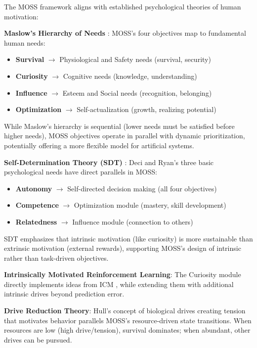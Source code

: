 \documentclass[10pt,a4paper]{article}
\begin{document}
The MOSS framework aligns with established psychological theories of human motivation:

\textbf{Maslow's Hierarchy of Needs} \cite{maslow1943}: MOSS's four objectives map to fundamental human needs:
\begin{itemize}
    \item \textbf{Survival} $\rightarrow$ Physiological and Safety needs (survival, security)
    \item \textbf{Curiosity} $\rightarrow$ Cognitive needs (knowledge, understanding)
    \item \textbf{Influence} $\rightarrow$ Esteem and Social needs (recognition, belonging)
    \item \textbf{Optimization} $\rightarrow$ Self-actualization (growth, realizing potential)
\end{itemize}

While Maslow's hierarchy is sequential (lower needs must be satisfied before higher needs), MOSS objectives operate in parallel with dynamic prioritization, potentially offering a more flexible model for artificial systems.

\textbf{Self-Determination Theory (SDT)} \cite{ryan2000}: Deci and Ryan's three basic psychological needs have direct parallels in MOSS:
\begin{itemize}
    \item \textbf{Autonomy} $\rightarrow$ Self-directed decision making (all four objectives)
    \item \textbf{Competence} $\rightarrow$ Optimization module (mastery, skill development)
    \item \textbf{Relatedness} $\rightarrow$ Influence module (connection to others)
\end{itemize}

SDT emphasizes that intrinsic motivation (like curiosity) is more sustainable than extrinsic motivation (external rewards), supporting MOSS's design of intrinsic rather than task-driven objectives.

\textbf{Intrinsically Motivated Reinforcement Learning}: The Curiosity module directly implements ideas from ICM \cite{pathak2017}, while extending them with additional intrinsic drives beyond prediction error.

\textbf{Drive Reduction Theory}: Hull's concept of biological drives creating tension that motivates behavior parallels MOSS's resource-driven state transitions. When resources are low (high drive/tension), survival dominates; when abundant, other drives can be pursued.
\end{document}
